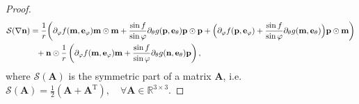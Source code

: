 \documentclass[10pt, a4paper]{article}
\newcommand\n{\mathbf{n}}
\newcommand\e{\mathbf{e}}
\newcommand\m{\mathbf{m}}
\newcommand\p{\mathbf{p}}
\newcommand\pp{\partial}
\begin{document}
\begin{proof}
\begin{equation}
\begin{aligned}
    &  \mathcal{S}(\nabla \n ) =  \frac{1}{r} \biggl( \pp_{\varphi} f (\m, \e_{\varphi}) \m \odot \m  + \frac{\sin f}{\sin \varphi} \pp_{\theta} g  (\p, \e_{\theta}) \p \odot \p + \Bigl( \pp_{\varphi} f (\p, \e_{\varphi}) +  \frac{\sin f}{\sin \varphi} \pp_{\theta} g  (\m, \e_{\theta}) \Bigr) \p \odot \m \biggr) \\
& \qquad ~~~~~ + \n \odot  \frac{1}{r} \left( \pp_{\varphi} f (\m, \e_{\varphi}) \m + \dfrac{\sin f}{\sin \varphi} \pp_{\theta} g  (\n, \e_{\theta}) \p \right),  \\ 
 \end{aligned}
\end{equation}
 where $\mathcal{S} \left( \mathbf{A} \right)$ is the symmetric part of a matrix $\mathbf{A}$, i.e. $\mathcal{S}(\mathbf{A}) = \frac{1}{2}( \mathbf{A} + \mathbf{A}^{\mathrm{T}}), \quad \forall \mathbf{A} \in \mathbb{R}^{3 \times 3}$.


\end{proof}
\end{document}
